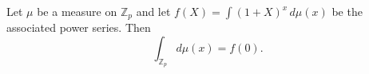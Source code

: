 Let $\mu$ be a measure on $\mathbb{Z}_p$ and let $f(X) = \int (1+X)^x \, d\mu(x)$ be the associated power series. Then
$$
\int_{\mathbb{Z}_p} d\mu(x) = f(0).
$$
